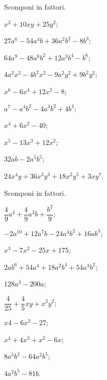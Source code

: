 \begin{esercizio}
 Scomponi in fattori.
 \begin{multicols}{2}
 \begin{enumeratea}
\item $x^{2}+10xy+25y^{2}$;
\item $27a^{6}-54a^{4}b+36a^{2}b^{2}-8b^{3}$;
\item $64a^{9}-48a^{6}b^{2}+12a^{3}b^{4}-b^{6}$;
\item $4a^{2}x^{2}-4b^{2}x^{2}-9a^{2}y^{2}+9b^{2}y^{2}$;
\item $x^{6}-6x^{4}+12x^{2}-8$;
\item $a^{7}-a^{4}b^{2}-4a^{3}b^{2}+4b^{4}$;
\item $x^{4}+6x^{2}-40$;
\item $x^{5}-13x^{3}+12x^{2}$;
\item $32ab-2a^{5}b^{5}$;
\item $24x^{4}y+36x^{3}y^{3}+18x^{2}y^{5}+3xy^{7}$.
 \end{enumeratea}
 \end{multicols}
\end{esercizio}


\begin{esercizio}
 Scomponi in fattori.
 \begin{multicols}{2}
 \begin{enumeratea}
  \item $\dfrac{4}{9}a^{4}+\dfrac{4}{9}a^{2}b+\dfrac{b^{2}}{9}$;
\item $-2a^{10}+12a^{7}b-24a^{4}b^{2}+16{ab}^{3}$;
\item $x^{3}-7x^{2}-25x+175$;
\item $2ab^{6}+54a^{4}+18a^{2}b^{4}+54a^{3}b^{2}$;
\item $128a^{3}-200a$;
\item $\dfrac{4}{25}+\dfrac{4}{5}xy+x^{2}y^{2}$;
\item $x{4}-6x^{2}-27$;
\item $x^{4}+4x^{3}+x^{2}-6x$;
\item $8a^{5}b^{2}-64a^{2}b^{5}$;
\item $4a^{2}b^{5}-81b$.
 \end{enumeratea}
 \end{multicols}
\end{esercizio}

